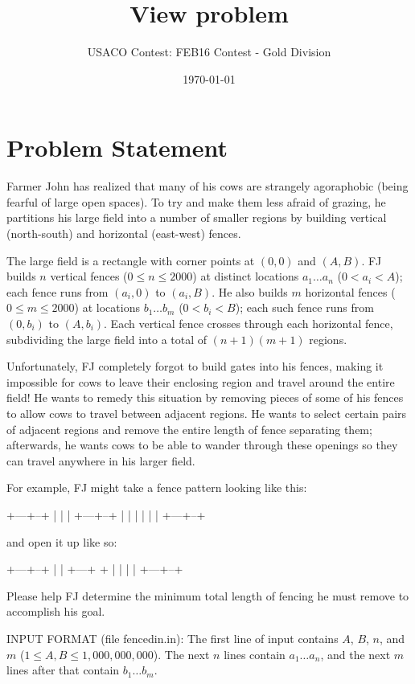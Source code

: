 \documentclass[12pt]{article}
\title{View problem}
\author{USACO Contest: FEB16 Contest - Gold Division}
\date{\today}
\begin{document}
\maketitle

\section*{Problem Statement}

Farmer John has realized that many of his cows are strangely agoraphobic (being
fearful of large open spaces). To try and make them less afraid of grazing, he
partitions his large field into a number of smaller regions by building
vertical (north-south) and horizontal (east-west) fences.  

The large field is a rectangle with corner points at $(0,0)$ and $(A,B)$.  FJ
builds $n$ vertical fences  ($0 \leq n \leq 2000$) at distinct locations
$a_1 \ldots a_n$ ($0 < a_i < A$); each fence runs from $(a_i, 0)$ to $(a_i, B)$.
He also builds $m$ horizontal fences ($0 \leq m \leq 2000$) at locations
$b_1 \ldots b_m$ ($0 < b_i < B$); each such fence runs from $(0, b_i)$ to
$(A, b_i)$. Each vertical fence crosses through each horizontal fence,
subdividing the large field into a  total of $(n+1)(m+1)$ regions.

Unfortunately, FJ completely forgot to build gates into his fences, making it
impossible for cows to leave their enclosing region and travel around the entire
field!  He wants to remedy this situation by removing pieces of some of his
fences to allow cows to travel between adjacent regions.  He wants to select
certain pairs of adjacent regions and remove the entire length of fence
separating them; afterwards, he wants cows to be able to wander through these
openings so they can travel anywhere in his larger field.

For example, FJ might take a fence pattern looking like this:


+---+--+
|   |  |
+---+--+
|   |  |  
|   |  |
+---+--+

and open it up like so:


+---+--+
|      |  
+---+  +  
|      |  
|      |
+---+--+

Please help FJ determine the minimum total length of fencing he must remove to
accomplish his goal.

INPUT FORMAT (file fencedin.in):
The first line of input contains $A$, $B$, $n$, and $m$
($1 \leq A, B \leq 1,000,000,000$). The next $n$ lines contain $a_1 \ldots a_n$,
and the next $m$ lines after that contain $b_1 \ldots b_m$.
\end{document}
